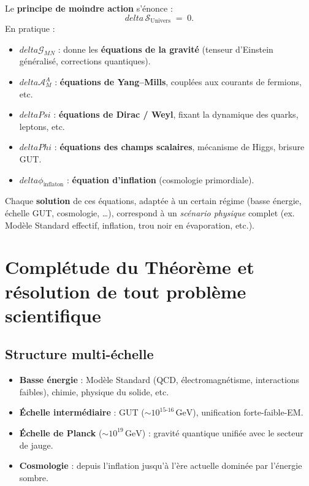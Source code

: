 \documentclass[12pt]{article}
\def\Phi{Phi}%
\def\Psi{Psi}%
\def\delta{delta}%
\begin{document}
Le \textbf{principe de moindre action} s'énonce :
\[
\delta\,\mathcal{S}_{\text{Univers}} 
\;=\; 0.
\]
En pratique :

\begin{itemize}
    \item \(\delta \mathcal{G}_{MN}\) : donne les \textbf{équations de la gravité} (tenseur d'Einstein généralisé, corrections quantiques).  
    \item \(\delta \mathcal{A}_M^A\) : \textbf{équations de Yang–Mills}, couplées aux courants de fermions, etc.  
    \item \(\delta \Psi\) : \textbf{équations de Dirac / Weyl}, fixant la dynamique des quarks, leptons, etc.  
    \item \(\delta \Phi\) : \textbf{équations des champs scalaires}, mécanisme de Higgs, brisure GUT.  
    \item \(\delta \phi_{\text{inflaton}}\) : \textbf{équation d'inflation} (cosmologie primordiale).  
\end{itemize}

Chaque \textbf{solution} de ces équations, adaptée à un certain régime (basse énergie, échelle GUT, cosmologie, \ldots), correspond à un \emph{scénario physique} complet (ex. Modèle Standard effectif, inflation, trou noir en évaporation, etc.).

\section{Complétude du Théorème et résolution de tout problème scientifique}
\label{sec:completude}

\subsection{Structure multi-échelle}
\begin{itemize}
    \item \textbf{Basse énergie} : Modèle Standard (QCD, électromagnétisme, interactions faibles), chimie, physique du solide, etc.  
    \item \textbf{Échelle intermédiaire} : GUT (\(\sim 10^{15\text{-}16}\,\mathrm{GeV}\)), unification forte-faible-EM.  
    \item \textbf{Échelle de Planck} (\(\sim 10^{19}\,\mathrm{GeV}\)) : gravité quantique unifiée avec le secteur de jauge.  
    \item \textbf{Cosmologie} : depuis l'inflation jusqu'à l'ère actuelle dominée par l'énergie sombre.
\end{itemize}
\end{document}
